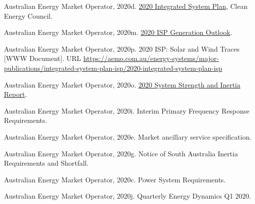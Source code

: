 \documentclass[12pt,a4paper,]{report}
\newlength{\cslhangindent}
\newenvironment{CSLReferences}[2] %
 {%
  \setlength{\parindent}{0pt}
  \ifodd #1 \everypar{\setlength{\hangindent}{\cslhangindent}}\ignorespaces\fi
  \ifnum #2 > 0
  \setlength{\parskip}{#2\baselineskip}
  \fi
 }%
 {}
\begin{document}
\begin{CSLReferences}{1}{0}
\leavevmode{}%
Australian Energy Market Operator, 2020d.
\href{https://aemo.com.au/energy-systems/major-publications/integrated-system-plan-isp/2020-integrated-system-plan-isp}{2020
{Integrated System Plan}}, Clean Energy Council.

\leavevmode{}%
Australian Energy Market Operator, 2020m.
\href{https://aemo.com.au/-/media/files/major-publications/isp/2020/final-2020-isp-generation-outlook.zip?la=en}{2020
{ISP Generation Outlook}}.

\leavevmode{}%
Australian Energy Market Operator, 2020p. 2020 {ISP}: {Solar} and {Wind
Traces} {[}WWW Document{]}. URL
\url{https://aemo.com.au/energy-systems/major-publications/integrated-system-plan-isp/2020-integrated-system-plan-isp}

\leavevmode{}%
Australian Energy Market Operator, 2020o.
\href{https://www.aemo.com.au/-/media/files/electricity/nem/planning_and_forecasting/Operability/2020/2020-System-Strength-and-Inertia-Report\#:~:text=previously\%20declared\%20system\%20strength\%20and\%20inertia\%20shortfalls&text=The\%20inertia\%20requirements\%20include\%20the,when\%20a\%20reg}{2020
{System Strength} and {Inertia Report}}.

\leavevmode{}%
Australian Energy Market Operator, 2020i. Interim {Primary Frequency
Response Requirements}.

\leavevmode{}%
Australian Energy Market Operator, 2020e. Market ancillary service
specification.

\leavevmode{}%
Australian Energy Market Operator, 2020g. Notice of {South Australia
Inertia Requirements} and {Shortfall}.

\leavevmode{}%
Australian Energy Market Operator, 2020c. Power {System Requirements}.

\leavevmode{}%
Australian Energy Market Operator, 2020j. Quarterly {Energy Dynamics Q1}
2020.


\end{CSLReferences}
\end{document}
